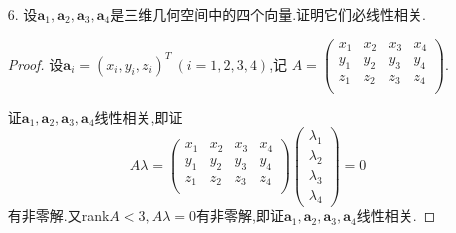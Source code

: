 \documentclass{article}
\begin{document}
\begin{enumerate}
\begin{proof}
\[\begin{vmatrix}
                    x_1-x_4 & y_1-y_4 & z_1-z_4 & 0\\
                    x_2-x_4 & y_2-y_4 & z_2-z_4 & 0\\
                    x_3-x_4 & y_3-y_4 & z_3-z_4 & 0\\
                    x_4 & y_4 & z_4 & 1
                \end{vmatrix}
                =0.
                \Leftrightarrow
                P_i,i=1,2,3,4\mbox{共面}.
            \]
        \end{proof}
        \item [6.]设$\boldsymbol{a}_1,\boldsymbol{a}_2,\boldsymbol{a}_3,\boldsymbol{a}_4$是三维几何空间中的四个向量.证明它们必线性相关.
        \begin{proof}
            设$\boldsymbol{a}_i={(x_i,y_i,z_i)}^T\ (i=1,2,3,4)$,记
            $A=\begin{pmatrix}
                x_1 & x_2 & x_3 & x_4\\
                y_1 & y_2 & y_3 & y_4\\
                z_1 & z_2 & z_3 & z_4\\
            \end{pmatrix}$.

            证$\boldsymbol{a}_1,\boldsymbol{a}_2,\boldsymbol{a}_3,\boldsymbol{a}_4$线性相关,即证
            \[
                A\lambda =
                \begin{pmatrix}
                    x_1 & x_2 & x_3 & x_4\\
                    y_1 & y_2 & y_3 & y_4\\
                    z_1 & z_2 & z_3 & z_4\\
                \end{pmatrix}
                \begin{pmatrix}
                    \lambda_1\\
                    \lambda_2\\
                    \lambda_3\\
                    \lambda_4
                \end{pmatrix}
                =0
            \]
            有非零解.又rank$A<3,A\lambda=0$有非零解,即证$\boldsymbol{a}_1,\boldsymbol{a}_2,\boldsymbol{a}_3,\boldsymbol{a}_4$线性相关.
        \end{proof}
    \end{enumerate}
\end{document}
